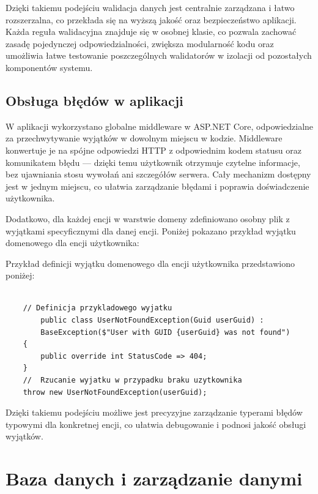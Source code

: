  Dzięki takiemu podejściu walidacja danych jest centralnie zarządzana i łatwo rozszerzalna, co przekłada się na wyższą jakość oraz bezpieczeństwo aplikacji. Każda reguła walidacyjna znajduje się w osobnej klasie, co pozwala zachować zasadę pojedynczej odpowiedzialności, zwiększa modularność kodu oraz umożliwia łatwe testowanie poszczególnych walidatorów w izolacji od pozostałych komponentów systemu.



\subsection{Obsługa błędów w aplikacji}
    W aplikacji wykorzystano globalne middleware w ASP.NET Core, odpowiedzialne za przechwytywanie wyjątków w dowolnym miejscu w kodzie. Middleware konwertuje je na spójne odpowiedzi HTTP z odpowiednim kodem statusu oraz komunikatem błędu — dzięki temu użytkownik otrzymuje czytelne informacje, bez ujawniania stosu wywołań ani szczegółów serwera. Cały mechanizm dostępny jest w jednym miejscu, co ułatwia zarządzanie błędami i poprawia doświadczenie użytkownika.

Dodatkowo, dla każdej encji w warstwie domeny zdefiniowano osobny plik z wyjątkami specyficznymi dla danej encji.
Poniżej pokazano przykład wyjątku domenowego dla encji użytkownika:


    Przykład definicji wyjątku domenowego dla encji użytkownika przedstawiono poniżej:
\begin{lstlisting}[language={[Sharp]C}, caption={Przykład definicji wyjątku domenowego dla encji użytkownika}]

    // Definicja przykladowego wyjatku 
        public class UserNotFoundException(Guid userGuid) :
        BaseException($"User with GUID {userGuid} was not found")
    {
        public override int StatusCode => 404;
    }
    //  Rzucanie wyjatku w przypadku braku uzytkownika
    throw new UserNotFoundException(userGuid);
    \end{lstlisting}

    Dzięki takiemu podejściu możliwe jest precyzyjne zarządzanie typerami błędów typowymi dla konkretnej encji, co ułatwia debugowanie i podnosi jakość obsługi wyjątków.


\section{Baza danych i zarządzanie danymi}

